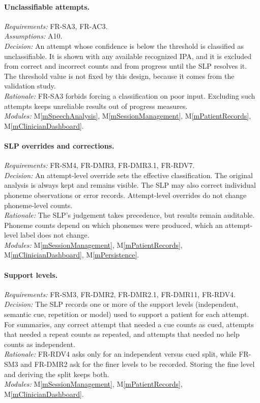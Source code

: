 \documentclass[12pt, titlepage]{article}
\newcommand{\mref}[1]{M\ref{#1}}
\begin{document}
\paragraph{Unclassifiable attempts.}
\emph{Requirements:} FR-SA3, FR-AC3.\\
\emph{Assumptions:} A10.\\
\emph{Decision:} An attempt whose confidence is below the threshold is
classified as unclassifiable. It is shown with any available recognized IPA,
and it is excluded from correct and incorrect counts and from progress until
the SLP resolves it. The threshold value is not fixed by this design, because
it comes from the validation study.\\
\emph{Rationale:} FR-SA3 forbids forcing a classification on poor input.
Excluding such attempts keeps unreliable results out of progress measures.\\
\emph{Modules:} \mref{mSpeechAnalysis}, \mref{mSessionManagement},
 \mref{mPatientRecords}, \mref{mClinicianDashboard}.

\paragraph{SLP overrides and corrections.}
\emph{Requirements:} FR-SM4, FR-DMR3, FR-DMR3.1, FR-RDV7.\\
\emph{Decision:} An attempt-level override sets the effective classification.
The original analysis is always kept and remains visible. The SLP may also
correct individual phoneme observations or error records. Attempt-level
overrides do not change phoneme-level counts.\\
\emph{Rationale:} The SLP's judgement takes precedence, but results remain
auditable. Phoneme counts depend on which phonemes were produced, which an
attempt-level label does not change.\\
\emph{Modules:} \mref{mSessionManagement}, \mref{mPatientRecords}, \mref{mClinicianDashboard}, \mref{mPersistence}.

\paragraph{Support levels.}
\emph{Requirements:} FR-SM3, FR-DMR2, FR-DMR2.1, FR-DMR11, FR-RDV4.\\
\emph{Decision:} The SLP records one or more of the support levels (independent,
semantic cue, repetition or model) used to support a patient for each attempt. For summaries, any correct
attempt that needed a cue counts as cued, attempts that needed a repeat counts as repeated, and attempts that needed no help counts as independent.\\
\emph{Rationale:} FR-RDV4 asks only for an independent versus cued split, while
FR-SM3 and FR-DMR2 ask for the finer levels to be recorded. Storing the fine
level and deriving the split keeps both.\\
\emph{Modules:} \mref{mSessionManagement}, \mref{mPatientRecords}, \mref{mClinicianDashboard}.
\end{document}
